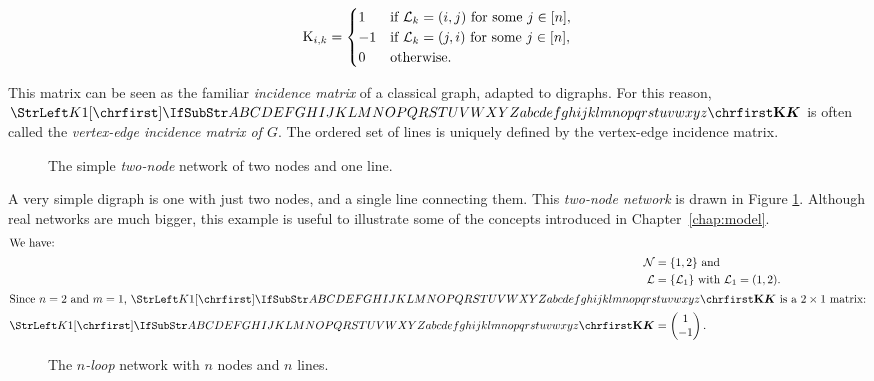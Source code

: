 \documentclass[main.tex]{subfiles}
\begin{document}
\begin{align*}
    {\mathrm{K}}_{i,k} =
    \begin{cases}
         1 & \text{if } \mathcal{L}_k=(i,j) \text{ for some } j \in [n], \\
        -1 & \text{if } \mathcal{L}_k=(j,i) \text{ for some } j \in [n], \\
         0 & \text{otherwise}.
    \end{cases}
\end{align*}

This matrix can be seen as the familiar \emph{incidence matrix} of a classical graph, adapted to digraphs. For this reason, $\mat{K}$ is often called the \emph{vertex-edge incidence matrix of $G$}.
The ordered set of lines is uniquely defined by the vertex-edge incidence matrix.

\begin{figure}
    \centering
    
    \caption{The simple \emph{two-node} network of two nodes and one line.}
    \label{fig:twonodes}
\end{figure}
\begin{example}\label{exa:twonodenetwork}
A very simple digraph is one with just two nodes, and a single line connecting them. This \emph{two-node network} is drawn in Figure \ref{fig:twonodes}.
Although real networks are much bigger, this example is useful to illustrate some of the concepts introduced in Chapter~\ref{chap:model}.
\begin{align*}
    \intertext{We have:}
    \mathcal{N}&=\{1,2\} \text{ and}\\
    \mathcal{L}&=\{\mathcal{L}_1\}\text{ with }\mathcal{L}_1=(1,2). \\
    \intertext{Since $n=2$ and $m=1$, $\mat{K}$ is a $2\times 1$ matrix:}
    \mat{K} &= \begin{pmatrix}
    1 \\
    -1
    \end{pmatrix}.
\end{align*}
\end{example}

\begin{figure}[h]
    \centering
    
    \caption{The \emph{$n$-loop} network with $n$ nodes and $n$ lines.}
    \label{fig:nloopnetwork}
\end{figure}
\end{document}
